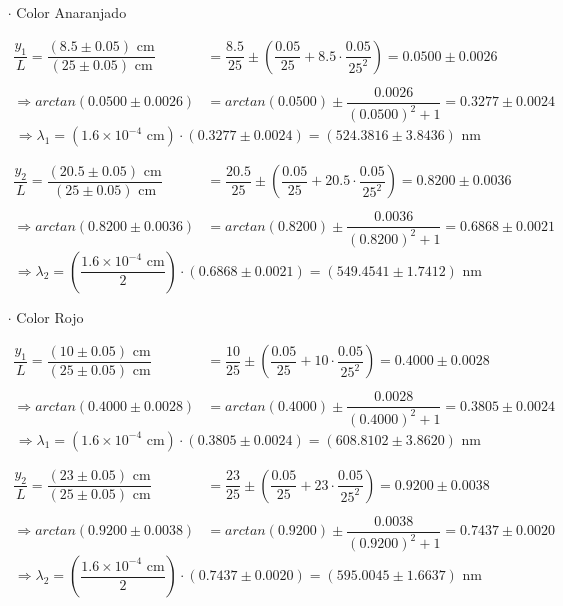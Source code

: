 \documentclass[12pt,a4paper]{article}
\begin{document}
\begin{itemize}
 		
 		\item [$\cdot$] Color Anaranjado
 		
 		\begin{align*}
 			\dfrac{y_1}{L}=\dfrac{(8.5\pm 0.05)\mbox{ cm}}{(25\pm 0.05)\mbox{ cm}}&=
 			\dfrac{8.5}{25}\pm\left(\dfrac{0.05}{25}+8.5\cdot\dfrac{0.05}{25^2}\right)=
 			0.0500\pm0.0026 \\\\
 			\Longrightarrow arctan(0.0500\pm0.0026 )&=
 			arctan(0.0500)\pm\dfrac{0.0026}{(0.0500)^2+1}=
 			0.3277\pm 0.0024
 		\end{align*}
 		$$\Longrightarrow \lambda_1=
 		(1.6\times 10^{-4}\mbox{ cm})\cdot
 		(0.3277\pm 0.0024 )=(524.3816\pm3.8436 )\mbox{ nm}$$
 		
 		\begin{align*}
 			\dfrac{y_2}{L}=\dfrac{(20.5\pm 0.05)\mbox{ cm}}{(25\pm 0.05)\mbox{ cm}}&=
 			\dfrac{20.5}{25}\pm\left(\dfrac{0.05}{25}+20.5\cdot\dfrac{0.05}{25^2}\right)=
 			0.8200\pm0.0036 \\\\
 			\Longrightarrow arctan(0.8200\pm0.0036)&=
 			arctan(0.8200)\pm\dfrac{0.0036}{(0.8200)^2+1}=
 			0.6868\pm 0.0021
 		\end{align*}
 		$$\Longrightarrow \lambda_2=
 		\left(\dfrac{1.6\times 10^{-4}\mbox{ cm}}{2}\right)\cdot
 		(0.6868\pm 0.0021 )=(549.4541\pm 1.7412 )\mbox{ nm}$$
 		
 		\item [$\cdot$] Color Rojo
 		
 		\begin{align*}
 			\dfrac{y_1}{L}=\dfrac{(10\pm 0.05)\mbox{ cm}}{(25\pm 0.05)\mbox{ cm}}&=
 			\dfrac{10}{25}\pm\left(\dfrac{0.05}{25}+10\cdot\dfrac{0.05}{25^2}\right)=
 			0.4000\pm0.0028 \\\\
 			\Longrightarrow arctan(0.4000\pm0.0028)&=
 			arctan(0.4000)\pm\dfrac{0.0028}{(0.4000)^2+1}=
 			0.3805\pm0.0024 
 		\end{align*}
 		$$\Longrightarrow \lambda_1=
 		(1.6\times 10^{-4}\mbox{ cm})\cdot
 		(0.3805\pm0.0024 )=(608.8102\pm3.8620 )\mbox{ nm}$$
 		
 		\begin{align*}
 			\dfrac{y_2}{L}=\dfrac{(23\pm 0.05)\mbox{ cm}}{(25\pm 0.05)\mbox{ cm}}&=
 			\dfrac{23}{25}\pm\left(\dfrac{0.05}{25}+23\cdot\dfrac{0.05}{25^2}\right)=
 			0.9200\pm0.0038 \\\\
 			\Longrightarrow arctan(0.9200\pm0.0038)&=
 			arctan(0.9200)\pm\dfrac{0.0038}{(0.9200)^2+1}=
 			0.7437\pm 0.0020
 		\end{align*}
 		$$\Longrightarrow \lambda_2=
 		\left(\dfrac{1.6\times 10^{-4}\mbox{ cm}}{2}\right)\cdot
 		(0.7437\pm 0.0020 )=(595.0045\pm1.6637 )\mbox{ nm}$$
 		
 		
 	\end{itemize}
 	
 	
\end{document}
